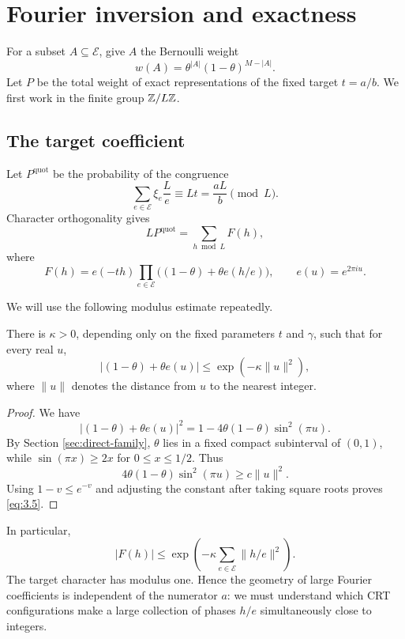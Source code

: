 \section{Fourier inversion and exactness}\label{sec:fourier}

For a subset $A\subseteq\mathcal E$, give $A$ the Bernoulli weight
\[
w(A)=\theta^{|A|}(1-\theta)^{M-|A|}.
\tag{3.1}\label{eq:3.1}
\]
Let $P$ be the total weight of exact representations of the fixed target $t=a/b$. We first work in the finite group $\mathbb Z/L\mathbb Z$.

\subsection{The target coefficient}

Let $P^{\mathrm{quot}}$ be the probability of the congruence
\[
\sum_{e\in\mathcal E}\xi_e\frac{L}{e}
\equiv Lt=\frac{aL}{b}\pmod L.
\tag{3.2}\label{eq:3.2}
\]
Character orthogonality gives
\[
L P^{\mathrm{quot}}
=\sum_{h\bmod L}F(h),
\tag{3.3}\label{eq:3.3}
\]
where
\[
F(h)
=
e(-th)
\prod_{e\in\mathcal E}
\bigl((1-\theta)+\theta e(h/e)\bigr),
\qquad
e(u)=e^{2\pi iu}.
\tag{3.4}\label{eq:3.4}
\]

We will use the following modulus estimate repeatedly.

\begin{lemma}\label{lem:bernoulli-modulus}
There is $\kappa>0$, depending only on the fixed parameters $t$ and $\gamma$, such that for every real $u$,
\[
\left|(1-\theta)+\theta e(u)\right|
\le
\exp(-\kappa\|u\|^2),
\tag{3.5}\label{eq:3.5}
\]
where $\|u\|$ denotes the distance from $u$ to the nearest integer.
\end{lemma}

\begin{proof}
We have
\[
\left|(1-\theta)+\theta e(u)\right|^2
=
1-4\theta(1-\theta)\sin^2(\pi u).
\]
By Section \ref{sec:direct-family}, $\theta$ lies in a fixed compact subinterval of $(0,1)$, while $\sin(\pi x)\ge2x$ for $0\le x\le1/2$. Thus
\[
4\theta(1-\theta)\sin^2(\pi u)
\ge c\|u\|^2.
\]
Using $1-v\le e^{-v}$ and adjusting the constant after taking square roots proves \eqref{eq:3.5}.
\end{proof}

In particular,
\[
|F(h)|
\le
\exp\!\left(-\kappa
\sum_{e\in\mathcal E}\|h/e\|^2\right).
\tag{3.6}\label{eq:3.6}
\]
The target character has modulus one. Hence the geometry of large Fourier coefficients is independent of the numerator $a$: we must understand which CRT configurations make a large collection of phases $h/e$ simultaneously close to integers.

